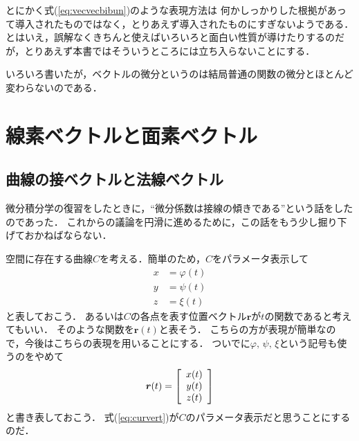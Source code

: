 とにかく式(\ref{eq:vecvecbibun})のような表現方法は
何かしっかりした根拠があって導入されたものではなく，とりあえず導入されたものにすぎないようである．
とはいえ，誤解なくきちんと使えばいろいろと面白い性質が導けたりするのだが，とりあえず本書ではそういうところには立ち入らないことにする．

いろいろ書いたが，ベクトルの微分というのは結局普通の関数の微分とほとんど変わらないのである．



\section{線素ベクトルと面素ベクトル}
\subsection{曲線の接ベクトルと法線ベクトル}
微分積分学の復習をしたときに，``微分係数は接線の傾きである''という話をしたのであった．
これからの議論を円滑に進めるために，この話をもう少し掘り下げておかねばならない．

空間に存在する曲線$C$を考える．簡単のため，$C$をパラメータ表示して
\begin{align*}
x & = \varphi (t) \\
y & = \psi (t) \\
z & = \xi (t)
\end{align*}
と表しておこう．
あるいは$C$の各点を表す位置ベクトル$\bm{r}$が$t$の関数であると考えてもいい．
そのような関数を$\bm{r} (t)$と表そう．
こちらの方が表現が簡単なので，今後はこちらの表現を用いることにする．
ついでに$\varphi, \, \psi , \, \xi$という記号も使うのをやめて
\begin{align}
\renewcommand{\arraystretch}{1}
\bm{r} (t) = \left[
\begin{array}{c}
x(t) \\
y(t) \\
z(t)
\end{array}
\right]
\label{eq:curvert}
\end{align}
と書き表しておこう．
式(\ref{eq:curvert})が$C$のパラメータ表示だと思うことにするのだ．

